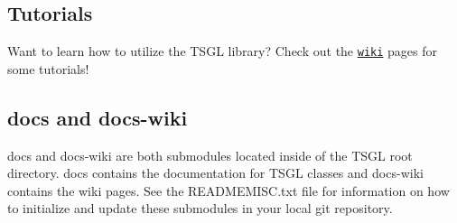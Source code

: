  \subsection*{Tutorials }

Want to learn how to utilize the T\-S\-G\-L library? Check out the \href{https://github.com/Calvin-CS/TSGL/wiki}{\tt wiki} pages for some tutorials! 

 \subsection*{docs and docs-\/wiki }

docs and docs-\/wiki are both submodules located inside of the T\-S\-G\-L root directory. docs contains the documentation for T\-S\-G\-L classes and docs-\/wiki contains the wiki pages. See the R\-E\-A\-D\-M\-E\-M\-I\-S\-C.\-txt file for information on how to initialize and update these submodules in your local git repository. 
